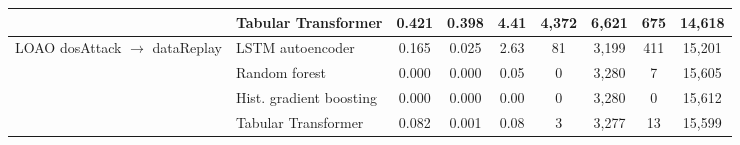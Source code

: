 \begin{tabular}{llccccccc}
 & Tabular Transformer & 0.421 & 0.398 & 4.41 & 4{,}372 & 6{,}621 & 675 & 14{,}618 \\
\midrule
LOAO dosAttack $\rightarrow$ dataReplay & LSTM autoencoder & 0.165 & 0.025 & 2.63 & 81 & 3{,}199 & 411 & 15{,}201 \\
 & Random forest & 0.000 & 0.000 & 0.05 & 0 & 3{,}280 & 7 & 15{,}605 \\
 & Hist. gradient boosting & 0.000 & 0.000 & 0.00 & 0 & 3{,}280 & 0 & 15{,}612 \\
 & Tabular Transformer & 0.082 & 0.001 & 0.08 & 3 & 3{,}277 & 13 & 15{,}599 \\
\bottomrule
\end{tabular}

